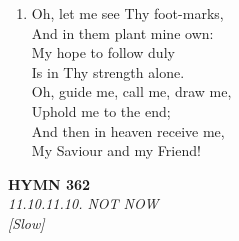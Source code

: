 \begin{enumerate}
    \item Oh, let me see Thy foot-marks, \\
        And in them plant mine own: \\
        My hope to follow duly \\
        Is in Thy strength alone. \\
        Oh, guide me, call me, draw me, \\
        Uphold me to the end; \\
        And then in heaven receive me, \\
        My Saviour and my Friend!

\end{enumerate}

\newpage
\begin{center}
    {\Large \textbf{HYMN 362}}
    \\
    \textit{11.10.11.10. NOT NOW}
    \\
    \textit{\small [Slow]}
\end{center}
\vspace{1em}

